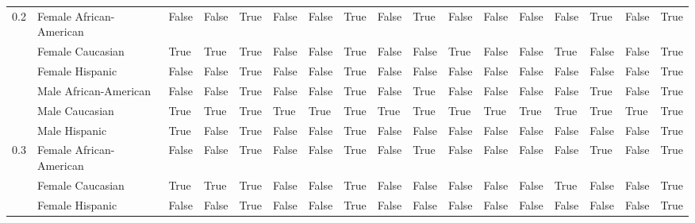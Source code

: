 \begin{tabular}{lllllllllllllllll}
0.2 & Female African-American &       False &           False &        True &         False &       False &           True &               False &        True &       False &                  False &                False &       False &        True &          False &              True \\
    & Female Caucasian &        True &            True &        True &         False &       False &           True &               False &       False &        True &                  False &                False &        True &       False &          False &              True \\
    & Female Hispanic &       False &           False &        True &         False &       False &           True &               False &       False &       False &                  False &                False &       False &       False &          False &              True \\
    & Male African-American &       False &           False &        True &         False &       False &           True &               False &        True &       False &                  False &                False &       False &        True &          False &              True \\
    & Male Caucasian &        True &            True &        True &          True &        True &           True &                True &        True &        True &                   True &                 True &        True &        True &           True &              True \\
    & Male Hispanic &        True &           False &        True &         False &       False &           True &               False &       False &       False &                  False &                False &       False &       False &          False &              True \\
0.3 & Female African-American &       False &           False &        True &         False &       False &           True &               False &        True &       False &                  False &                False &       False &        True &          False &              True \\
    & Female Caucasian &        True &            True &        True &         False &       False &           True &               False &       False &       False &                  False &                False &        True &       False &          False &              True \\
    & Female Hispanic &       False &           False &        True &         False &       False &           True &               False &       False &       False &                  False &                False &       False &       False &          False &              True \\

\end{tabular}

